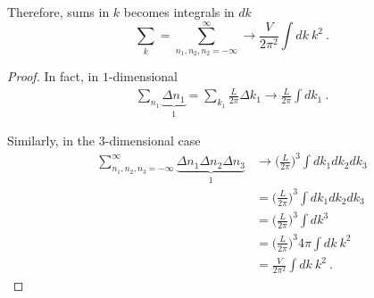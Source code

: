     Therefore, sums in $k$ becomes integrals in $dk$ 
    \begin{equation*}
        \sum_k = \sum_{n_1, n_2, n_2 = -\infty}^\infty \rightarrow \frac{V}{2\pi^2} \int dk~k^2 ~.
    \end{equation*}
    \begin{proof}
        In fact, in $1$-dimensional
        \begin{equation*}
        \begin{aligned}
            \sum_{n_1} \underbrace{\Delta n_1}_1 = \sum_{k_1} \frac{L}{2\pi} \Delta k_1 \rightarrow \frac{L}{2\pi} \int dk_1 ~.
        \end{aligned}
        \end{equation*}

        Similarly, in the $3$-dimensional case
        \begin{equation*}
        \begin{aligned}
            \sum_{n_1, n_2, n_3=- \infty}^\infty \underbrace{\Delta n_1 \Delta n_2 \Delta n_3}_1 & \rightarrow \Big ( \frac{L}{2\pi} \Big)^3 \int dk_1 dk_2 dk_3 \\ & = \Big ( \frac{L}{2\pi} \Big)^3 \int dk_1 dk_2 dk_3 \\ & = \Big ( \frac{L}{2\pi} \Big)^3 \int dk^3 \\ & = \Big ( \frac{L}{2\pi} \Big)^3 4 \pi \int dk ~ k^2 \\ & = \frac{V}{2\pi^2} \int dk~k^2 ~. 
        \end{aligned}
        \end{equation*}
    \end{proof}

